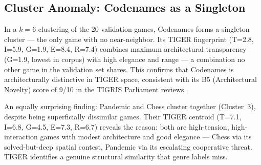 \subsection{Cluster Anomaly: Codenames as a Singleton}

In a $k=6$ clustering of the 20 validation games, Codenames forms a singleton cluster ---
the only game with no near-neighbor. Its TIGER fingerprint (T=2.8, I=5.9, G=1.9, E=8.4, R=7.4)
combines maximum architectural transparency (G=1.9, lowest in corpus) with high
elegance and range --- a combination no other game in the validation set shares.
This confirms that Codenames is architecturally distinctive in TIGER space, consistent
with its B5 (Architectural Novelty) score of 9/10 in the TIGRIS Parliament reviews.

An equally surprising finding: Pandemic and Chess cluster together (Cluster~3),
despite being superficially dissimilar games. Their TIGER centroid
(T=7.1, I=6.8, G=4.5, E=7.3, R=6.7) reveals the reason: both are high-tension,
high-interaction games with modest architecture and good elegance ---
Chess via its solved-but-deep spatial contest, Pandemic via its escalating
cooperative threat. TIGER identifies a genuine structural similarity
that genre labels miss.
